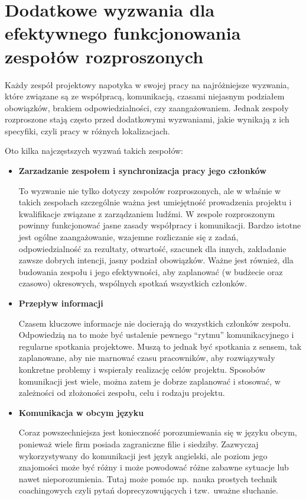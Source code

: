 \section{Dodatkowe wyzwania dla efektywnego funkcjonowania zespołów rozproszonych}

Każdy zespół projektowy napotyka w swojej pracy na najróżniejsze wyzwania,
które związane są ze współpracą, komunikacją, czasami niejasnym podziałem obowiązków,
brakiem odpowiedzialności, czy zaangażowaniem.
Jednak zespoły rozproszone stają często przed dodatkowymi wyzwaniami, jakie wynikają z ich specyfiki,
czyli pracy w różnych lokalizacjach.

Oto kilka najczęstszych wyzwań takich zespołów:

\begin{itemize}
	\item \textbf{Zarzadzanie zespołem i synchronizacja pracy jego członków}

	To wyzwanie nie tylko dotyczy zespołów rozproszonych,
	ale w właśnie w takich zespołach szczególnie ważna jest umiejętność prowadzenia projektu
	i kwalifikacje związane z zarządzaniem ludźmi.
	W zespole rozproszonym powinny funkcjonować jasne zasady współpracy i komunikacji.
	Bardzo istotne jest ogólne zaangażowanie, wzajemne rozliczanie się z zadań,
	odpowiedzialność za rezultaty, otwartość, szacunek dla innych,
	zakładanie zawsze dobrych intencji, jasny podział obowiązków.
	Ważne jest również, dla budowania zespołu i jego efektywności, aby zaplanować
	(w budżecie oraz czasowo) okresowych, wspólnych spotkań wszystkich członków.

	\item \textbf{Przepływ informacji}

	Czasem kluczowe informacje nie docierają do wszystkich członków zespołu.
	Odpowiedzią na to może być ustalenie pewnego ``rytmu'' komunikacyjnego i regularne spotkania projektowe.
	Muszą to jednak być spotkania z sensem, tak zaplanowane, aby nie marnować czasu pracowników,
	aby rozwiązywały konkretne problemy i wspierały realizację celów projektu.
	Sposobów komunikacji jest wiele, można zatem je dobrze zaplanować i stosować,
	w zależności od złożoności zespołu, celu i rodzaju projektu.

	\item \textbf{Komunikacja w obcym języku}

	Coraz powszechniejsza jest konieczność porozumiewania się w języku obcym,
	ponieważ wiele firm posiada zagraniczne filie i siedziby.
	Zazwyczaj wykorzystywany do komunikacji jest język angielski,
	ale poziom jego znajomości może być różny i może powodować różne zabawne sytuacje lub nawet nieporozumienia.
	Tutaj może pomóc np.\ nauka prostych technik coachingowych czyli pytań doprecyzowujących i tzw.\ uważne słuchanie.
\end{itemize}


